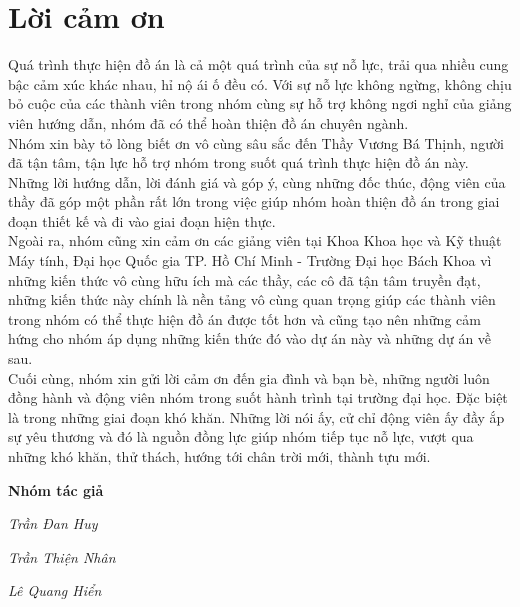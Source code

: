 \section*{Lời cảm ơn}
\thispagestyle{empty}
\hspace*{0.5cm} Quá trình thực hiện đồ án là cả một quá trình của sự nỗ lực, trải qua nhiều cung bậc cảm xúc khác nhau, hỉ nộ ái ố đều có. Với sự nỗ lực không ngừng, không chịu bỏ cuộc của các thành viên trong nhóm cùng sự hỗ trợ không ngơi nghỉ của giảng viên hướng dẫn, nhóm đã có thể hoàn thiện đồ án chuyên ngành.\\
\hspace*{0.5cm} Nhóm xin bày tỏ lòng biết ơn vô cùng sâu sắc đến Thầy Vương Bá Thịnh, người đã tận tâm, tận lực hỗ trợ nhóm trong suốt quá trình thực hiện đồ án này. Những lời hướng dẫn, lời đánh giá và góp ý, cùng những đốc thúc, động viên của thầy đã góp một phần rất lớn trong việc giúp nhóm hoàn thiện đồ án trong giai đoạn thiết kế và đi vào giai đoạn hiện thực.\\
\hspace*{0.5cm} Ngoài ra, nhóm cũng xin cảm ơn các giảng viên tại Khoa Khoa học và Kỹ thuật Máy tính, Đại học Quốc gia TP. Hồ Chí Minh - Trường Đại học Bách Khoa vì những kiến thức vô cùng hữu ích mà các thầy, các cô đã tận tâm truyền đạt, những kiến thức này chính là nền tảng vô cùng quan trọng giúp các thành viên trong nhóm có thể thực hiện đồ án được tốt hơn và cũng tạo nên những cảm hứng cho nhóm áp dụng những kiến thức
đó vào dự án này và những dự án về sau.\\
\hspace*{1cm} Cuối cùng, nhóm xin gửi lời cảm ơn đến gia đình và bạn bè, những người luôn đồng hành và động viên nhóm trong suốt hành trình tại trường đại học. Đặc biệt là trong những giai đoạn khó khăn. Những lời nói ấy, cử chỉ động viên ấy đầy ắp sự yêu thương và đó là nguồn đồng lực giúp nhóm tiếp tục nỗ lực, vượt qua những khó khăn, thử thách, hướng tới chân trời mới, thành tựu mới.
 
\par\hfill\textbf{Nhóm tác giả}\hspace{1cm}
\par\hfill\textit{Trần Đan Huy}\hspace{1cm}
\par\hfill\textit{Trần Thiện Nhân}\hspace{1cm}
\par\hfill\textit{Lê Quang Hiển}\hspace{1cm}

\clearpage
{}
